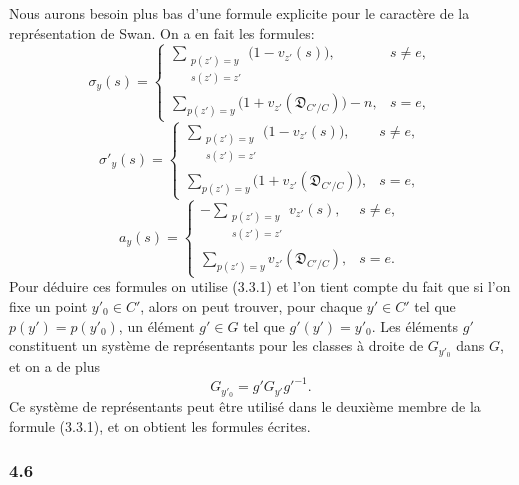 \documentclass[11pt]{article}
\begin{document}
Nous aurons besoin plus bas d'une formule explicite pour le caractère de la représentation de Swan. On a en fait les formules:
\[
\sigma_y(s)=
\begin{cases}
\displaystyle\sum_{\substack{p(z')=y\\s(z')=z'}}\bigl(1-v_{z'}(s)\bigr),& s\ne e,\\[0.8em]
\displaystyle\sum_{p(z')=y}\bigl(1+v_{z'}(\mathfrak D_{C'/C})\bigr)-n,& s=e,
\end{cases}
\tag{4.5.1}
\]
\[
\sigma'_y(s)=
\begin{cases}
\displaystyle\sum_{\substack{p(z')=y\\s(z')=z'}}\bigl(1-v_{z'}(s)\bigr),& s\ne e,\\[0.8em]
\displaystyle\sum_{p(z')=y}\bigl(1+v_{z'}(\mathfrak D_{C'/C})\bigr),& s=e,
\end{cases}
\tag{4.5.2}
\]
\[
a_y(s)=
\begin{cases}
\displaystyle-\sum_{\substack{p(z')=y\\s(z')=z'}}v_{z'}(s),& s\ne e,\\[0.8em]
\displaystyle\sum_{p(z')=y}v_{z'}(\mathfrak D_{C'/C}),& s=e.
\end{cases}
\tag{4.5.3}
\]
Pour déduire ces formules on utilise (3.3.1) et l'on tient compte du fait que si l'on fixe un point $y'_0\in C'$, alors on peut trouver, pour chaque $y'\in C'$ tel que $p(y')=p(y'_0)$, un élément $g'\in G$ tel que $g'(y')=y'_0$. Les éléments $g'$ constituent un système de représentants pour les classes à droite de $G_{y'_0}$ dans $G$, et on a de plus
\[
G_{y'_0}=g'G_{y'}g'^{-1}.
\]
Ce système de représentants peut être utilisé dans le deuxième membre de la formule (3.3.1), et on obtient les formules écrites.

\subsubsection*{4.6}
\end{document}
